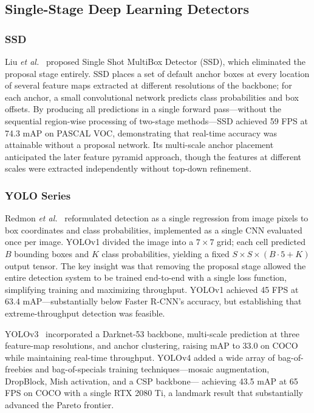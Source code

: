 \subsection{Single-Stage Deep Learning Detectors}

\subsubsection{SSD}

Liu \textit{et al.}~\cite{liu2016ssd} proposed Single Shot
MultiBox Detector (SSD), which eliminated the proposal stage
entirely.  SSD places a set of default anchor boxes at every
location of several feature maps extracted at different
resolutions of the backbone; for each anchor, a small
convolutional network predicts class probabilities and
box offsets.  By producing all predictions in a single forward
pass---without the sequential region-wise processing of
two-stage methods---SSD achieved 59 FPS at 74.3 mAP on PASCAL
VOC, demonstrating that real-time accuracy was attainable
without a proposal network.  Its multi-scale anchor placement
anticipated the later feature pyramid approach, though the
features at different scales were extracted independently
without top-down refinement.

\subsubsection{YOLO Series}

Redmon \textit{et al.}~\cite{redmon2016you} reformulated
detection as a single regression from image pixels to box
coordinates and class probabilities, implemented as a single
CNN evaluated once per image.  YOLOv1 divided the image into a
$7 \times 7$ grid; each cell predicted $B$ bounding boxes and
$K$ class probabilities, yielding a fixed $S \times S \times
(B \cdot 5 + K)$ output tensor.  The key insight was that
removing the proposal stage allowed the entire detection system
to be trained end-to-end with a single loss function,
simplifying training and maximizing throughput.  YOLOv1
achieved 45 FPS at 63.4 mAP---substantially below Faster
R-CNN's accuracy, but establishing that extreme-throughput
detection was feasible.

YOLOv3~\cite{redmon2018yolov3} incorporated a Darknet-53
backbone, multi-scale prediction at three feature-map
resolutions, and anchor clustering, raising mAP to 33.0 on
COCO while maintaining real-time throughput.  YOLOv4
\cite{bochkovskiy2020yolov4} added a wide array of
bag-of-freebies and bag-of-specials training techniques---mosaic
augmentation, DropBlock, Mish activation, and a CSP backbone---
achieving 43.5 mAP at 65 FPS on COCO with a single RTX 2080 Ti,
a landmark result that substantially advanced the Pareto frontier.

